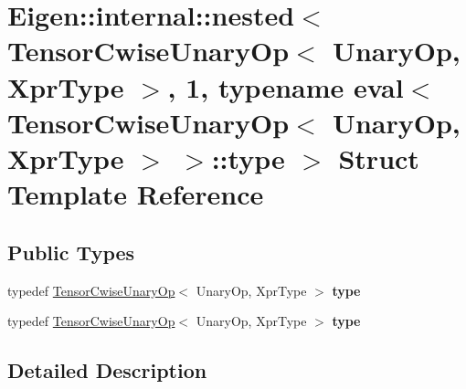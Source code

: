 \hypertarget{struct_eigen_1_1internal_1_1nested_3_01_tensor_cwise_unary_op_3_01_unary_op_00_01_xpr_type_01_4_1f8fce5c50cd854f51c6d2039d1e9327}{}\section{Eigen\+:\+:internal\+:\+:nested$<$ Tensor\+Cwise\+Unary\+Op$<$ Unary\+Op, Xpr\+Type $>$, 1, typename eval$<$ Tensor\+Cwise\+Unary\+Op$<$ Unary\+Op, Xpr\+Type $>$ $>$\+:\+:type $>$ Struct Template Reference}
\label{struct_eigen_1_1internal_1_1nested_3_01_tensor_cwise_unary_op_3_01_unary_op_00_01_xpr_type_01_4_1f8fce5c50cd854f51c6d2039d1e9327}
\subsection*{Public Types}
\begin{DoxyCompactItemize}
\item 
\mbox{\label{struct_eigen_1_1internal_1_1nested_3_01_tensor_cwise_unary_op_3_01_unary_op_00_01_xpr_type_01_4_1f8fce5c50cd854f51c6d2039d1e9327_af97d3177b23482eeb4eb9f4db8780807}} 
typedef \hyperlink{class_eigen_1_1_tensor_cwise_unary_op}{Tensor\+Cwise\+Unary\+Op}$<$ Unary\+Op, Xpr\+Type $>$ {\bfseries type}
\item 
\mbox{\label{struct_eigen_1_1internal_1_1nested_3_01_tensor_cwise_unary_op_3_01_unary_op_00_01_xpr_type_01_4_1f8fce5c50cd854f51c6d2039d1e9327_af97d3177b23482eeb4eb9f4db8780807}} 
typedef \hyperlink{class_eigen_1_1_tensor_cwise_unary_op}{Tensor\+Cwise\+Unary\+Op}$<$ Unary\+Op, Xpr\+Type $>$ {\bfseries type}
\end{DoxyCompactItemize}


\subsection{Detailed Description}
